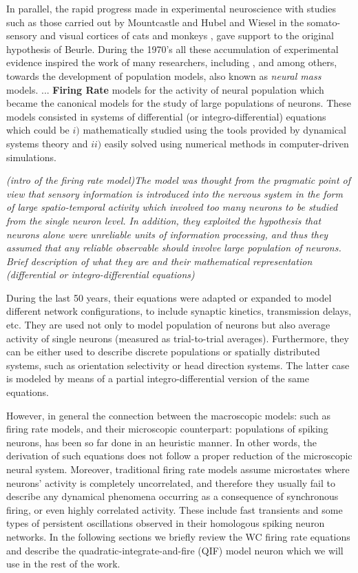 In parallel, the rapid progress made in experimental neuroscience
with studies such as those carried out by Mountcastle and Hubel and
Wiesel in the somato-sensory and visual cortices of cats and monkeys
\citep{Mountcastle1957,Hubel1962,Hubel1968}, gave support to the
original hypothesis of Beurle. During the 1970's all
these accumulation of experimental evidence 
inspired the work of many researchers, including
\citet{Wilson1972,Wilson1973}, \citet{Kni72} and
\citet{Amari1972,Ama74,Amari1977} among others, towards the
development of  population models, also known as \textit{neural mass}
models. ...
\textbf{Firing Rate} models for the activity of neural population which
became the canonical models for the study of large populations of
neurons. These models consisted in systems of differential (or
integro-differential) equations which could be $i)$ mathematically
studied using the tools provided by dynamical systems theory and $ii)$
easily solved using numerical methods in computer-driven simulations.

\textit{(intro of the firing rate model)The model was thought from the
  pragmatic point of view that sensory 
information is introduced into the nervous system in the form of large
spatio-temporal activity which involved too many neurons to be studied
from the single neuron level. In addition, they exploited the
hypothesis that neurons alone were unreliable units of information
processing, and thus they assumed that any reliable observable should
involve large population of neurons.
}
\textit{Brief description of what they are and their
  mathematical representation (differential or integro-differential equations)}

During the last 50 years, their equations were adapted or expanded to
model different network configurations, to include synaptic kinetics,
transmission delays, etc. They are used not only to model population
of neurons but also average activity of single neurons (measured as
trial-to-trial averages). Furthermore, they can be either used to
describe discrete populations or spatially distributed systems, such
as orientation selectivity or head direction systems. The latter case
is modeled by means of a partial integro-differential version of the
same equations.

However, in general the connection between the macroscopic models:
such as firing rate models, and their microscopic counterpart:
populations of spiking neurons, has been so far done in an heuristic
manner. In other words, the derivation of such equations does not
follow a proper reduction of the microscopic neural system. Moreover,
traditional firing rate models assume microstates  where neurons'
activity is completely uncorrelated, and therefore they usually
fail to describe any dynamical phenomena occurring as a consequence
of synchronous firing, or even highly correlated activity. These
include fast transients and some types of persistent oscillations
observed in their homologous spiking neuron networks. In the following
sections we briefly review the WC firing rate equations and describe
the quadratic-integrate-and-fire (QIF) model neuron which we will use
in the rest of the work.
\newline 

